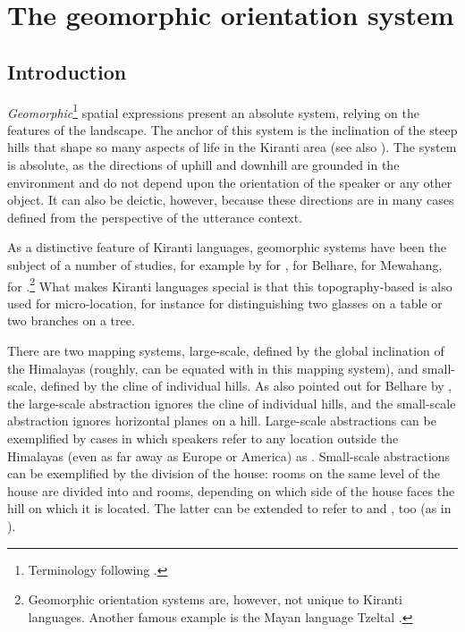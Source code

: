 \chapter{The geomorphic orientation system}\label{ch-geomorphic}

\section{Introduction}

\emph{Geomorphic}\footnote{Terminology following \citet{Bickel1997Spatial}.} spatial expressions present an absolute system, relying on the features of the landscape. The anchor of this system is the inclination of the steep hills that shape so many aspects of life in the Kiranti area (see also ). The system is absolute, as the directions of uphill and downhill are grounded in the environment and do not depend upon the orientation of the speaker or any other object. It can also be deictic, however, because these directions are in many cases defined from the perspective of the utterance context. 

As a distinctive  feature of Kiranti languages, geomorphic systems have been the subject of a number of studies, for example by \citet{Allen1972The-vertical} for , \citet{Bickel1994Mapping, Bickel1999Cultural, Bickel1997Spatial, Bickel2001Deictic} for Belhare, \citet{Gaenszle1999Travelling} for Mewahang, \citet{Dirksmeyer2008Spatial} for .\footnote{Geomorphic orientation systems are, however, not unique to Kiranti languages. Another famous example is the Mayan language Tzeltal \citep{Brownetal1993Uphill}.} What makes Kiranti languages special is that this topography-based  is also used for micro-location, for instance for distinguishing two glasses on a table or two branches on a tree. 

There are two mapping systems, large-scale, defined by the global inclination of the Himalayas (roughly,  can be equated with  in this mapping system), and small-scale, defined by the cline of individual hills. As also pointed out for Belhare by \citet[55]{Bickel1997Spatial}, the large-scale abstraction ignores the cline of individual hills, and the small-scale abstraction ignores horizontal planes on a hill. Large-scale abstractions can be exemplified by cases in which speakers refer to any location outside the Himalayas (even as far away as Europe or America) as . Small-scale abstractions can be exemplified by the division of the house: rooms on the same level of the house are divided into  and  rooms, depending on which side of the house faces the hill on which it is located. The latter can be extended to refer to  and , too (as in ). 

